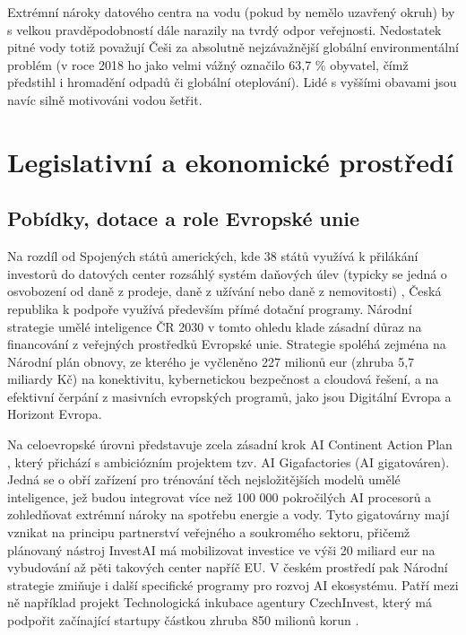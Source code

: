Extrémní nároky datového centra na vodu (pokud by nemělo uzavřený okruh) by s velkou pravděpodobností dále narazily na tvrdý odpor veřejnosti. Nedostatek pitné vody totiž považují Češi za absolutně nejzávažnější globální environmentální problém (v roce 2018 ho jako velmi vážný označilo 63,7 \% obyvatel, čímž předstihl i hromadění odpadů či globální oteplování). Lidé s vyššími obavami jsou navíc silně motivováni vodou šetřit. \cite{hejdukova_water_2020}

\section{Legislativní a ekonomické prostředí}
\label{sec:cz_legislativa}


\subsection{Pobídky, dotace a role Evropské unie}
\label{subsec:cz_legislativa_pobidky}

Na rozdíl od Spojených států amerických, kde 38 států využívá k přilákání investorů do datových center rozsáhlý systém daňových úlev (typicky se jedná o osvobození od daně z prodeje, daně z užívání nebo daně z nemovitosti) \cite{gargano_subsidizing_2025}, Česká republika k podpoře využívá především přímé dotační programy. Národní strategie umělé inteligence ČR 2030 \cite{ministerstvo_prumyslu_a_obchodu_narodni_2024} v tomto ohledu klade zásadní důraz na financování z veřejných prostředků Evropské unie. Strategie spoléhá zejména na Národní plán obnovy, ze kterého je vyčleněno 227 milionů eur (zhruba 5,7 miliardy Kč) na konektivitu, kybernetickou bezpečnost a cloudová řešení, a na efektivní čerpání z masivních evropských programů, jako jsou Digitální Evropa a Horizont Evropa.

Na celoevropské úrovni představuje zcela zásadní krok AI Continent Action Plan \cite{european_commission_ai_2025}, který přichází s ambiciózním projektem tzv. AI Gigafactories (AI gigatováren). Jedná se o obří zařízení pro trénování těch nejsložitějších modelů umělé inteligence, jež budou integrovat více než 100 000 pokročilých AI procesorů a zohledňovat extrémní nároky na spotřebu energie a vody. Tyto gigatovárny mají vznikat na principu partnerství veřejného a soukromého sektoru, přičemž plánovaný nástroj InvestAI má mobilizovat investice ve výši 20 miliard eur na vybudování až pěti takových center napříč EU. V českém prostředí pak Národní strategie zmiňuje i další specifické programy pro rozvoj AI ekosystému. Patří mezi ně například projekt Technologická inkubace agentury CzechInvest, který má podpořit začínající startupy částkou zhruba 850 milionů korun \cite{ministerstvo_prumyslu_a_obchodu_narodni_2024}.

